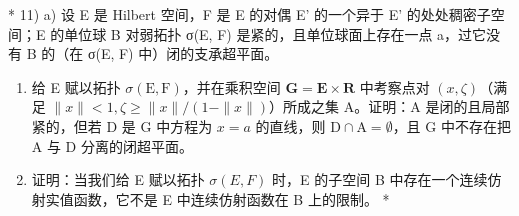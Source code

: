 * 11) a) 设 E 是 Hilbert 空间，F 是 E 的对偶 E' 的一个异于 E' 的处处稠密子空间；E 的单位球 B 对弱拓扑 σ(E, F) 是紧的，且单位球面上存在一点 a，过它没有 B 的（在 σ(E, F) 中）闭的支承超平面。

\begin{enumerate}
\def\labelenumi{\alph{enumi})}
\setcounter{enumi}{1}
\item
  给 E 赋以拓扑 \(\sigma(\mathrm{E},\mathrm{F})\)，并在乘积空间 \(\mathbf{G} = \mathbf{E} \times \mathbf{R}\) 中考察点对 \((x,\zeta)\)（满足 \(\|x\| < 1, \zeta \geqslant \|x\| / (1 - \|x\|)\)）所成之集 A。证明：A 是闭的且局部紧的，但若 D 是 G 中方程为 \(x = a\) 的直线，则 \(\mathrm{D} \cap \mathrm{A} = \emptyset\)，且 G 中不存在把 A 与 D 分离的闭超平面。
\item
  证明：当我们给 E 赋以拓扑 \(\sigma(E, F)\) 时，E 的子空间 B 中存在一个连续仿射实值函数，它不是 E 中连续仿射函数在 B 上的限制。 *
\end{enumerate}

